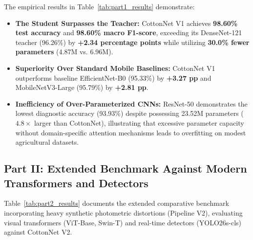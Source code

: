 \documentclass[journal,10pt,twocolumn]{IEEEtran}
\begin{document}
\begin{table}[htbp]
\centering
\caption{Part I benchmark results across classical and mobile CNNs.}
\label{tab:part1_results}
\end{table}

The empirical results in Table~\ref{tab:part1_results} demonstrate:
\begin{itemize}[leftmargin=*]
    \item \textbf{The Student Surpasses the Teacher:} CottonNet V1 achieves \textbf{98.60\% test accuracy} and \textbf{98.60\% macro F1-score}, exceeding its DenseNet-121 teacher (96.26\%) by \textbf{+2.34 percentage points} while utilizing \textbf{30.0\% fewer parameters} (4.87M vs. 6.96M).
    \item \textbf{Superiority Over Standard Mobile Baselines:} CottonNet V1 outperforms baseline EfficientNet-B0 (95.33\%) by \textbf{+3.27 pp} and MobileNetV3-Large (95.79\%) by \textbf{+2.81 pp}.
    \item \textbf{Inefficiency of Over-Parameterized CNNs:} ResNet-50 demonstrates the lowest diagnostic accuracy (93.93\%) despite possessing 23.52M parameters ($4.8\times$ larger than CottonNet), illustrating that excessive parameter capacity without domain-specific attention mechanisms leads to overfitting on modest agricultural datasets.
\end{itemize}

\subsection{Part II: Extended Benchmark Against Modern Transformers and Detectors}
Table~\ref{tab:part2_results} documents the extended comparative benchmark incorporating heavy synthetic photometric distortions (Pipeline V2), evaluating visual transformers (ViT-Base, Swin-T) and real-time detectors (YOLO26s-cls) against CottonNet V2.
\end{document}
